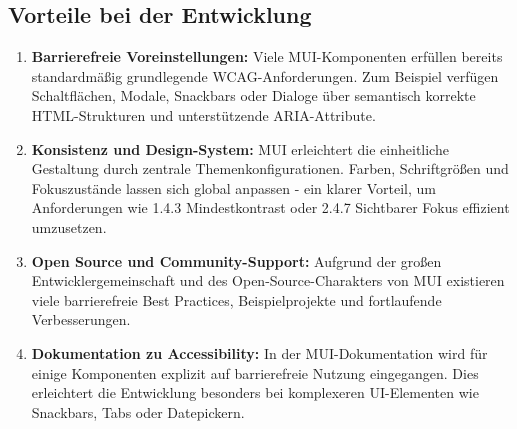 \subsection{Vorteile bei der Entwicklung}

\begin{enumerate}
    \item \textbf{Barrierefreie Voreinstellungen:} Viele MUI-Komponenten erfüllen bereits standardmäßig grundlegende WCAG-Anforderungen. Zum Beispiel verfügen Schaltflächen, Modale, Snackbars oder Dialoge über semantisch korrekte HTML-Strukturen und unterstützende ARIA-Attribute.

    \item \textbf{Konsistenz und Design-System:} MUI erleichtert die einheitliche Gestaltung durch zentrale Themenkonfigurationen. Farben, Schriftgrößen und Fokuszustände lassen sich global anpassen - ein klarer Vorteil, um Anforderungen wie 1.4.3 Mindestkontrast oder 2.4.7 Sichtbarer Fokus effizient umzusetzen.

    \item \textbf{Open Source und Community-Support:} Aufgrund der großen Entwicklergemeinschaft und des Open-Source-Charakters von MUI existieren viele barrierefreie Best Practices, Beispielprojekte und fortlaufende Verbesserungen.

    \item \textbf{Dokumentation zu Accessibility:} In der MUI-Dokumentation wird für einige Komponenten explizit auf barrierefreie Nutzung eingegangen. Dies erleichtert die Entwicklung besonders bei komplexeren UI-Elementen wie Snackbars, Tabs oder Datepickern.
\end{enumerate}

